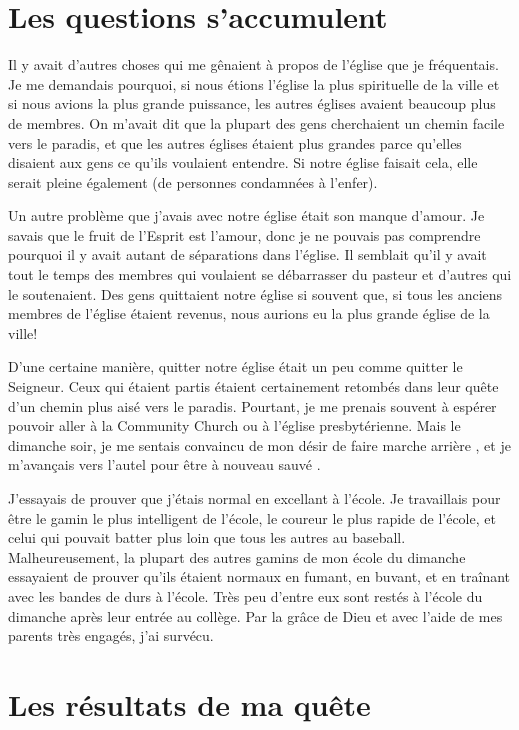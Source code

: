 \section*{Les questions s'accumulent}

Il y avait d'autres choses qui me gênaient à propos de l'église que je
 fréquentais. Je me demandais pourquoi, si nous étions l'église la plus
 spirituelle de la ville et si nous avions la plus grande puissance, les autres
 églises avaient beaucoup plus de membres. On m'avait dit que la plupart des
 gens cherchaient un chemin facile vers le paradis, et que les autres églises
 étaient plus grandes parce qu'elles disaient aux gens ce qu'ils voulaient
 entendre. Si notre église faisait cela, elle serait pleine également
 (de personnes condamnées à l'enfer).

Un autre problème que j'avais avec notre église était son manque d'amour. Je
 savais que le fruit de l'Esprit est l'amour, donc je ne pouvais pas comprendre
 pourquoi il y avait autant de séparations dans l'église. Il semblait qu'il y
 avait tout le temps des membres qui voulaient se débarrasser du pasteur et
 d'autres qui le soutenaient. Des gens quittaient notre église si souvent que,
 si tous les anciens membres de l'église étaient revenus, nous aurions eu la
 plus grande église de la ville!

D'une certaine manière, quitter notre église était un peu comme quitter le
 Seigneur. Ceux qui étaient partis étaient certainement retombés dans leur quête
 d'un chemin plus aisé vers le paradis. Pourtant, je me prenais souvent à
 espérer pouvoir aller à la Community Church ou à l'église presbytérienne. Mais
 le dimanche soir, je me sentais convaincu de mon désir de \og faire marche
 arrière \fg{}, et je m'avançais vers l'autel pour être à nouveau
 \og sauvé \fg{}.

J'essayais de prouver que j'étais normal en excellant à l'école. Je travaillais
 pour être le gamin le plus intelligent de l'école, le coureur le plus rapide de
 l'école, et celui qui pouvait batter plus loin que tous les autres au baseball.
 Malheureusement, la plupart des autres gamins de mon école du dimanche
 essayaient de prouver qu'ils étaient normaux en fumant, en buvant, et en
 traînant avec les bandes de durs à l'école. Très peu d'entre eux sont restés à
 l'école du dimanche après leur entrée au collège. Par la grâce de Dieu et avec
 l'aide de mes parents très engagés, j'ai survécu.

\section*{Les résultats de ma quête}


